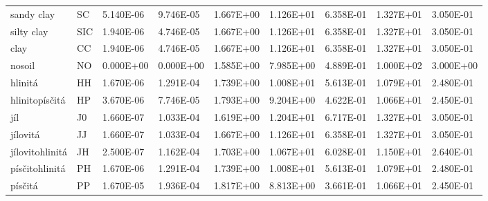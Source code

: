 \begin{sidewaystable}
{\begin{tabular}{lllllllll}
sandy clay      & SC   & 5.140E-06 & 9.746E-05 & 1.667E+00 & 1.126E+01 & 6.358E-01 & 1.327E+01 & 3.050E-01 \\
silty clay      & SIC  & 1.940E-06 & 4.746E-05 & 1.667E+00 & 1.126E+01 & 6.358E-01 & 1.327E+01 & 3.050E-01 \\
clay            & CC   & 1.940E-06 & 4.746E-05 & 1.667E+00 & 1.126E+01 & 6.358E-01 & 1.327E+01 & 3.050E-01 \\
nosoil          & NO   & 0.000E+00 & 0.000E+00 & 1.585E+00 & 7.985E+00 & 4.889E-01 & 1.000E+02 & 3.000E+00 \\
hlinitá         & HH   & 1.670E-06 & 1.291E-04 & 1.739E+00 & 1.008E+01 & 5.613E-01 & 1.079E+01 & 2.480E-01 \\
hlinitopísčitá  & HP   & 3.670E-06 & 7.746E-05 & 1.793E+00 & 9.204E+00 & 4.622E-01 & 1.066E+01 & 2.450E-01 \\
jíl             & J0   & 1.660E-07 & 1.033E-04 & 1.619E+00 & 1.204E+01 & 6.717E-01 & 1.327E+01 & 3.050E-01 \\
jílovitá        & JJ   & 1.660E-07 & 1.033E-04 & 1.667E+00 & 1.126E+01 & 6.358E-01 & 1.327E+01 & 3.050E-01 \\
jílovitohlinitá & JH   & 2.500E-07 & 1.162E-04 & 1.703E+00 & 1.067E+01 & 6.028E-01 & 1.150E+01 & 2.640E-01 \\
písčitohlinitá  & PH   & 1.670E-06 & 1.291E-04 & 1.739E+00 & 1.008E+01 & 5.613E-01 & 1.079E+01 & 2.480E-01 \\
písčitá         & PP   & 1.670E-05 & 1.936E-04 & 1.817E+00 & 8.813E+00 & 3.661E-01 & 1.066E+01 & 2.450E-01 \\
\hline \hline
\end{tabular}
}
\end{sidewaystable}